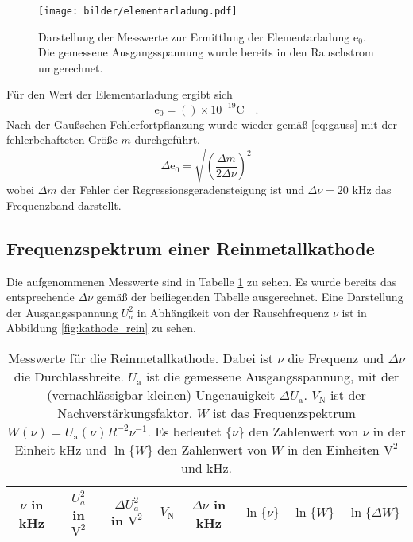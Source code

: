 	\begin{figure}
		\centering
		\texttt{[image: bilder/elementarladung.pdf]}
		\caption{Darstellung der Messwerte zur Ermittlung der
		Elementarladung $\text{e}_0$. Die gemessene Ausgangsspannung
		wurde bereits in den Rauschstrom umgerechnet.}
		\label{fig:elementarladung}
	\end{figure}

	Für den Wert der Elementarladung ergibt sich
	\begin{equation}
	\text{e}_0 = () \times
				10^{-19}\text{C} \quad .
	\end{equation}
	Nach der Gaußschen Fehlerfortpflanzung wurde wieder gemäß \eqref{eq:gauss} mit der 
	fehlerbehafteten Größe $m$ durchgeführt.
	\begin{equation}
	\Delta \text{e}_0 = \sqrt{\left( \frac{\Delta m}{2 \Delta \nu} \right)^2}
	\end{equation}
	wobei $\Delta m$ der Fehler der Regressionsgeradensteigung ist und 
	$\Delta \nu=20\text{ kHz}$ das Frequenzband darstellt. 

\clearpage
\subsection{Frequenzspektrum einer Reinmetallkathode}

	Die aufgenommenen Messwerte sind in Tabelle
	\ref{tab:kathode_rein} zu sehen. Es wurde bereits das
	entsprechende $\Delta \nu$ gemäß der beiliegenden Tabelle
	ausgerechnet. Eine Darstellung der Ausgangsspannung $U_a^2$ in
	Abhängikeit von der Rauschfrequenz $\nu$ ist in Abbildung
	\ref{fig:kathode_rein} zu sehen.
	\begin{table}[h]
		\centering
		\begin{tabular}{cccccccc}
		\toprule \midrule
		$\nu$ in kHz	 & $U_a^2$ in $\text{V}^2$	& $\Delta U_a^2$ in $\text{V}^2$ & 
		$V_\text{N}$	 & $\Delta \nu$ in kHz 		& $\ln \{\nu\}$				     &	
		$\ln \{W\}$	 & $\ln \{\Delta W\} $ \\
		\midrule
		
		\midrule
		\bottomrule
		\end{tabular}
		\caption{Messwerte für
		die Reinmetallkathode. Dabei ist $\nu$ die Frequenz und $\Delta \nu$ die 
		Durchlassbreite. $U_\text{a}$ ist die gemessene Ausgangsspannung, mit der 
		(vernachlässigbar kleinen) Ungenauigkeit $\Delta U_\text{a}$. $V_\text{N}$ 
		ist der Nachverstärkungsfaktor. $W$ ist das Frequenzspektrum 
		$W(\nu)=U_\text{a}(\nu) R^{-2} \nu^{-1}$. Es bedeutet $\{\nu \}$ den 
		Zahlenwert von $\nu$ in der Einheit kHz und $\ln\{W\}$ den Zahlenwert 
		von $W$ in den Einheiten $\text{V}^2$ und kHz.}
		\label{tab:kathode_rein}
	\end{table}

